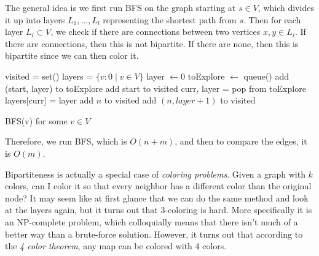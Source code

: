   \begin{algo}
    The general idea is we first run BFS on the graph starting at $s \in V$, which divides it up into layers $L_1, \ldots, L_l$ representing the shortest path from $s$. Then for each layer $L_i \subset V$, we check if there are connections between two vertices $x, y \in L_i$. If there are connections, then this is not bipartite. If there are none, then this is bipartite since we can then color it. 

    \begin{algorithm}[H]
      \label{alg:determine_bipartite}
      \begin{algorithmic}[1]
        \State visited = set() 
        \State layers = $\{v : 0 \mid v \in V \}$
          \State layer $\gets 0$ 
          \State toExplore $\gets$ queue() 
          \State add (start, layer) to toExplore 
          \State add start to visited
            \State curr, layer = pop from toExplore 
            \State layers[curr] = layer 
                \State add $n$ to visited 
                \State add $(n, layer+1)$ to visited 
              \EndIf
            \EndFor
          \EndWhile 
        \EndFunction

        \State 

          \State BFS(v) for some $v \in V$ 
              \State {} 
            \EndIf 
          \EndFor 
          \State {}
        \EndFunction
      \end{algorithmic}
    \end{algorithm}
    Therefore, we run BFS, which is $O(n+m)$, and then to compare the edges, it is $O(m)$. 
  \end{algo}

  Bipartiteness is actually a special case of \textit{coloring problems}. Given a graph with $k$ colors, can I color it so that every neighbor has a different color than the original node? It may seem like at first glance that we can do the same method and look at the layers again, but it turns out that 3-coloring is hard. More specifically it is an NP-complete problem, which colloquially means that there isn't much of a better way than a brute-force solution. However, it turns out that according to the \textit{4 color theorem}, any map can be colored with 4 colors. 

